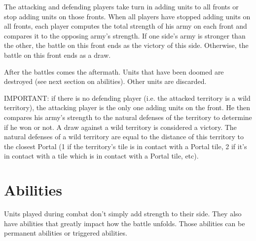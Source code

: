 \documentclass[a4paper]{article}
\begin{document}
    The attacking and defending players take turn in adding units to all fronts or stop adding units on those fronts.
    When all players have stopped adding units on all fronts, each player computes the total strength of his army on
    each front and compares it to the opposing army's strength.
    If one side's army is stronger than the other, the battle on this front ends as the victory of this side.
    Otherwise, the battle on this front ends as a draw.
    
    After the battles comes the aftermath.
    Units that have been doomed are destroyed (see next section on abilities).
    Other units are discarded.
    
    IMPORTANT: if there is no defending player (i.e. the attacked territory is a wild territory),
        the attacking player is the only one adding units on the front.
        He then compares his army's strength to the natural defenses of the territory to determine if he won or not.
        A draw against a wild territory is considered a victory.
        The natural defenses of a wild territory are equal to the distance of this territory to the closest Portal
        (1 if the territory's tile is in contact with a Portal tile, 2 if it's in contact with a tile which is in contact with a Portal tile, etc).


\newpage
\section{Abilities}

    Units played during combat don't simply add strength to their side.
    They also have abilities that greatly impact how the battle unfolds.
    Those abilities can be permanent abilities or triggered abilities.
\end{document}

